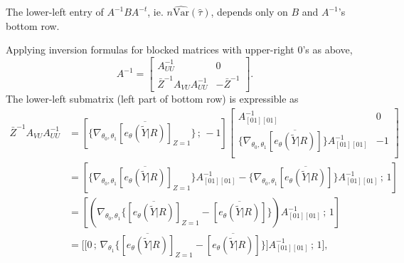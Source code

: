 \documentclass[12pt]{article}
\newcommand{\var}{\mathrm{Var}}
\begin{document}
The lower-left entry of $A^{-1}BA^{-t}$, ie. $n\widehat{\var}
(\hat\tau)$, depends only on $B$ and $A^{-1}$'s bottom row. 

Applying inversion formulas for blocked matrices with upper-right 0's
as above,
\begin{equation}
  \label{eq:1}
  A^{-1} = \left[
    \begin{array}{c|c}
      A_{UU}^{-1}& 0 \\[1ex] \hline
      \bar{Z}^{-1} A_{VU}A_{UU}^{-1} & - \bar{Z}^{-1}
    \end{array}
\right] .
\end{equation}
The lower-left submatrix (left part of bottom row) is expressible as 
\begin{align*}
  \bar{Z}^{-1} A_{VU}A_{UU}^{-1} &=  \left[\{ \nabla_{\theta_{0}, \theta_{1}} 
  \overline{[e_{\theta}(\tilde{Y} | R)]}_{Z=1} \} \, ;\,  -1  \right]
  \left[
    \begin{array}{cc}
      A_{[01][01]}^{-1}& 0 \\[1ex] {}
       \{ \nabla_{\theta_{0}, \theta_{1}}
      \overline{[e_{\theta}(\tilde{Y} | R)]} \} A_{[01][01]}^{-1} & -1 \\
    \end{array}
\right]  \\
&= \left[\{ \nabla_{\theta_0 , \theta_1}
  \overline{[e_{\theta}(\tilde{Y} | R)]}_{Z=1} \}  A_{[01][01]}^{-1} -
  \{ \nabla_{\theta_{0}, \theta_{1}}
      \overline{[e_{\theta}(\tilde{Y} | R)]} \} A_{[01][01]}^{-1}\, ;
      \, 1 \right] \\
&= \left[ ( \nabla_{\theta_0 , \theta_1} \{
  \overline{[e_{\theta}(\tilde{Y} | R)]}_{Z=1}  -
  \overline{[e_{\theta}(\tilde{Y} | R)]} \} ) A_{[01][01]}^{-1} \, ;
  \, 1 \right] \\
&= \bigg[ \big[ 0 \, ; \,  \nabla_{\theta_1}  \{
  \overline{[e_{\theta}(\tilde{Y} | R)]}_{Z=1}  -
  \overline{[e_{\theta}(\tilde{Y} | R)]} \} \big] A_{[01][01]}^{-1} \, ;
  \, 1 \bigg] ,\\
\end{align*}
\end{document}
